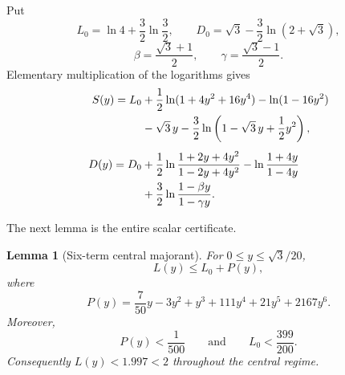 \documentclass[11pt]{article}
\newtheorem{lemma}[theorem]{Lemma}
\theoremstyle{definition}
\newcommand{\1}{\mathbf{1}}
\begin{document}
Put
\[
L_0=\ln4+\frac32\ln\frac32,
\qquad
D_0=\sqrt3-\frac32\ln(2+\sqrt3),
\]
\[
\beta=\frac{\sqrt3+1}{2},
\qquad
\gamma=\frac{\sqrt3-1}{2}.
\]
Elementary multiplication of the logarithms gives
\begin{align}
S(y)=L_0
&+\frac12\ln(1+4y^2+16y^4)-\ln(1-16y^2)\notag\\
&-\sqrt3\,y-\frac32\ln\left(1-\sqrt3\,y+\frac12y^2\right),
\label{eq:S-formula}\\[0.4em]
D(y)=D_0
&+\frac12\ln\frac{1+2y+4y^2}{1-2y+4y^2}
 -\ln\frac{1+4y}{1-4y}\notag\\
&+\frac32\ln\frac{1-\beta y}{1-\gamma y}.
\label{eq:D-formula}
\end{align}

The next lemma is the entire scalar certificate.

\begin{lemma}[Six-term central majorant]
For $0\le y\le\sqrt3/20$,
\begin{equation}
L(y)\le L_0+P(y),
\label{eq:majorant}
\end{equation}
where
\begin{equation}
P(y)=\frac7{50}y-3y^2+y^3+111y^4+21y^5+2167y^6.
\label{eq:P}
\end{equation}
Moreover,
\begin{equation}
P(y)<\frac1{500}
\qquad\text{and}\qquad
L_0<\frac{399}{200}.
\label{eq:P-L0-bounds}
\end{equation}
Consequently $L(y)<1.997<2$ throughout the central regime.
\end{lemma}
\end{document}
